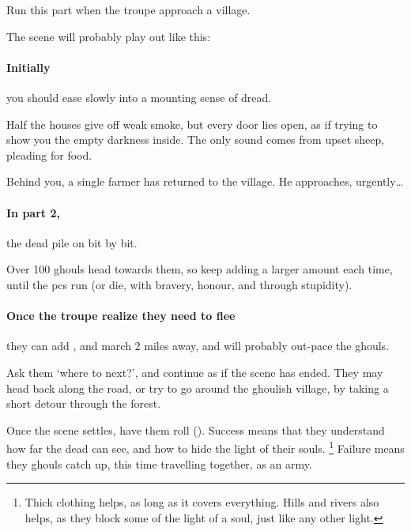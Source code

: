 Run this part when the troupe approach a \gls{village}.

The scene will probably play out like this:

\paragraph{Initially}
you should ease slowly into a mounting sense of dread.

\begin{boxtext}
  Half the houses give off weak smoke, but every door lies open, as if trying to show you the empty darkness inside.
  The only sound comes from upset sheep, pleading for food.

  Behind you, a single farmer has returned to the \gls{village}.
  He approaches, urgently\ldots
\end{boxtext}


\paragraph{In part 2,}
the dead pile on bit by bit.



Over 100 ghouls head towards them, so keep adding a larger amount each time, until the \glspl{pc} run (or die, with bravery, honour, and through stupidity).

\paragraph{Once the troupe realize they need to flee}
they can add , and march 2 miles away, and will probably out-pace the ghouls.

Ask them `where to next?', and continue as if the scene has ended.
They may head back along the road, or try to go around the ghoulish \gls{village}, by taking a short detour through the forest.

Once the scene settles, have them roll  (\tn[12]).
Success means that they understand how far the dead can see, and how to hide the light of their souls.%
\footnote{Thick clothing helps, as long as it covers everything. Hills and rivers also helps, as they block some of the light of a soul, just like any other light.}
Failure means they ghouls catch up, this time travelling together, as an army.

